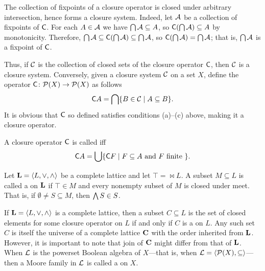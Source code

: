 The collection of fixpoints of a closure operator is closed
under arbitrary intersection, hence forms a closure system.
Indeed, let $\mathcal{A}$ be a collection of fixpoints of $\mathsf{C}$. 
For each $A \in \mathcal{A}$ we have $\bigcap \mathcal{A} \subseteq A$, so
$\mathsf{C}(\bigcap \mathcal{A}) \subseteq A$ by monotonicity.
Therefore, 
$\bigcap \mathcal{A} \subseteq \mathsf{C}(\bigcap \mathcal{A}) \subseteq \bigcap \mathcal{A}$, so
 $\mathsf{C} (\bigcap \mathcal{A}) =  \bigcap \mathcal{A}$; that is,  $\bigcap \mathcal{A}$ is a fixpoint of $\mathsf{C}$. 

Thus, if $\mathcal{C}$ is the collection of closed sets of
the closure operator $\mathsf{C}$, then $\mathcal{C}$ is a closure system. Conversely, given
a closure system $\mathcal{C}$ on a set $X$, define the operator
$\mathsf{C} \colon \mathcal{P}(X) \to \mathcal{P}(X)$ as follows
\[
\mathsf{C} A = \bigcap \{B \in \mathcal{C} \mid A\subseteq B\}.
\]
It is obvious that $\mathsf{C}$ so defined satisfies conditions (a)--(c)
above, making it a closure operator.


A closure operator $\mathsf{C}$ is called  iff
\[
\mathsf{C} A = \bigcup \{\mathsf{C} F \mid F \subseteq A \text{ and } F \text{ finite } \}.
\]


Let $\mathbf{L} = \langle L, \vee, \wedge\rangle$ be a complete lattice and let $\top = \Join L$.
A subset $M \subseteq L$ is called a  on
$\mathbf{L}$ if $\top\in M$ and every nonempty subset of $M$ is closed under meet.
That is, if $\emptyset \neq S \subseteq M$, then $\bigwedge S \in S$.

If $\mathbf{L} = \langle L, \vee, \wedge\rangle$ is a complete lattice, then a subset
$C \subseteq L$ is the set of closed elements for some closure operator on
$L$ if and only if $C$ is a  on $L$.
Any such set $C$ is itself the universe of a complete lattice $\mathbf{C}$
with the order inherited from $\mathbf{L}$.  However, it is important to note that
join of $\mathbf{C}$ might differ from that of $\mathbf{L}$.
When $\mathcal{L}$ is the powerset Boolean algebra of
$X$---that is, when $\mathcal{L} = \langle\mathcal{P}(X), \subseteq\rangle$---then a Moore family in $\mathcal{L}$ 
is called a  on $X$. 

